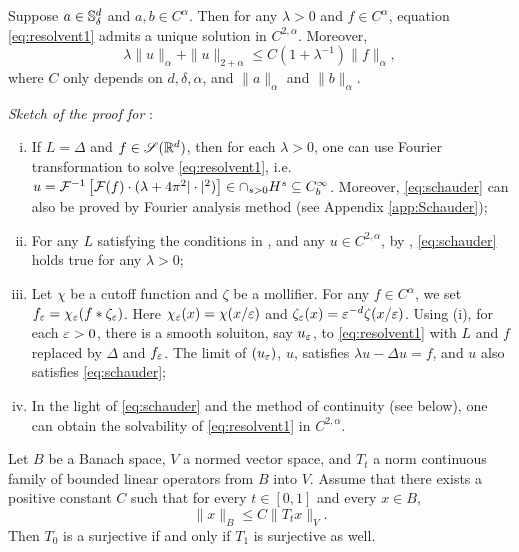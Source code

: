 \begin{theorem}\label{thm:Schauder}
    Suppose $a\in {\mathbb S}_\delta^d$ and $a, b\in C^\alpha$. Then for any $\lambda>0$ and $f\in C^\alpha$, equation \eqref{eq:resolvent1} admits a unique solution in $C^{2,\alpha}$. Moreover, 
    \begin{equation}\label{eq:schauder}
        \lambda \|u\|_{\alpha} + \|u\|_{2+\alpha} \leq C(1+\lambda^{-1}) \|f\|_{\alpha}, 
    \end{equation}
    where $C$ only depends on $d, \delta,\alpha$, and $\|a\|_\alpha$ and $\|b\|_{\alpha}$. 
\end{theorem}


	{\em Sketch of the proof for }: 
	\begin{enumerate}[(i)]
		\item If $L=\Delta$ and $f\in {\mathscr S}({\mathbb R}^d)$, then for each $\lambda>0$, one can use Fourier transformation to solve \eqref{eq:resolvent1}, i.e. $u={\mathcal F}^{-1}\left[ {\mathcal F}(f)\cdot(\lambda + 4\pi^2 |\cdot|^2) \right]\in \cap_{s>0} H^s\subseteq C^\infty_b$. Moreover, \eqref{eq:schauder} can also be proved by Fourier analysis method (see Appendix \ref{app:Schauder}); 
		\item For any $L$ satisfying the conditions in , and any $u\in C^{2,\alpha}$, by , \eqref{eq:schauder} holds true for any $\lambda>0$; 
		\item Let $\chi$ be a cutoff function and $\zeta$ be a mollifier. For any $f\in C^\alpha$, we set $f_\varepsilon=\chi_\varepsilon(f*\zeta_\varepsilon)$. Here $\chi_\varepsilon(x)=\chi(x/\varepsilon)$ and $\zeta_\varepsilon(x)= \varepsilon^{-d} \zeta(x/\varepsilon)$. Using (i), for each $\varepsilon>0$, there is a smooth soluiton, say $u_\varepsilon$, to \eqref{eq:resolvent1} with $L$ and $f$ replaced by $\Delta$ and $f_\varepsilon$. The limit of $(u_\varepsilon)$, $u$, satisfies $\lambda u-\Delta u=f$, and $u$ also satisfies \eqref{eq:schauder}; 
		\item In the light of \eqref{eq:schauder} and the method of continuity (see  below), one can obtain the solvability of \eqref{eq:resolvent1} in $C^{2,\alpha}$. 
	\end{enumerate}
	
	\begin{lemma}\label{lem:continum}
		Let $B$ be a Banach space, $V$ a normed vector space, and 
		$T_t$ a norm continuous family of bounded linear operators from $B$ into $V$. Assume that there exists a positive constant $C$ such that for every $t\in [0,1]$ and every $x\in B$, 
		\[
		\|x\|_{B} \leq C \|T_t x\|_{V}. 
		\]
		Then $T_0$ is a surjective if and only if  $T_1$ is surjective as well.
	\end{lemma}
	
